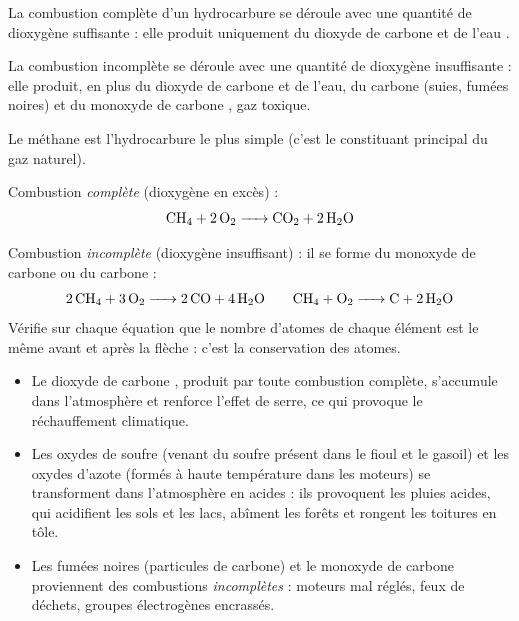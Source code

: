 \documentclass[11pt]{article}
\newcommand{\cle}[1]{{\popxbold\color{popdark}#1}}
\begin{document}
\begin{definition}
La \cle{combustion complète} d'un hydrocarbure se déroule avec une quantité de dioxygène suffisante : elle produit uniquement du \cle{dioxyde de carbone}  et de l'\cle{eau} .

La \cle{combustion incomplète} se déroule avec une quantité de dioxygène insuffisante : elle produit, en plus du dioxyde de carbone et de l'eau, du \cle{carbone}  (suies, fumées noires) et du \cle{monoxyde de carbone} , gaz toxique.
\end{definition}

\begin{exemplebox}
Le méthane  est l'hydrocarbure le plus simple (c'est le constituant principal du gaz naturel).

Combustion \emph{complète} (dioxygène en excès) :
\[ \ce{CH4 + 2O2 -> CO2 + 2H2O} \]

Combustion \emph{incomplète} (dioxygène insuffisant) : il se forme du monoxyde de carbone ou du carbone :
\[ \ce{2CH4 + 3O2 -> 2CO + 4H2O} \qquad \ce{CH4 + O2 -> C + 2H2O} \]
Vérifie sur chaque équation que le nombre d'atomes de chaque élément est le même avant et après la flèche : c'est la conservation des atomes.
\end{exemplebox}

\begin{aretenir}
\begin{itemize}
\item Le \cle{dioxyde de carbone} , produit par toute combustion complète, s'accumule dans l'atmosphère et renforce l'\cle{effet de serre}, ce qui provoque le réchauffement climatique.
\item Les \cle{oxydes de soufre} (venant du soufre présent dans le fioul et le gasoil) et les \cle{oxydes d'azote} (formés à haute température dans les moteurs) se transforment dans l'atmosphère en acides : ils provoquent les \cle{pluies acides}, qui acidifient les sols et les lacs, abîment les forêts et rongent les toitures en tôle.
\item Les \cle{fumées noires} (particules de carbone) et le \cle{monoxyde de carbone}  proviennent des combustions \emph{incomplètes} : moteurs mal réglés, feux de déchets, groupes électrogènes encrassés.
\end{itemize}
\end{aretenir}
\end{document}
